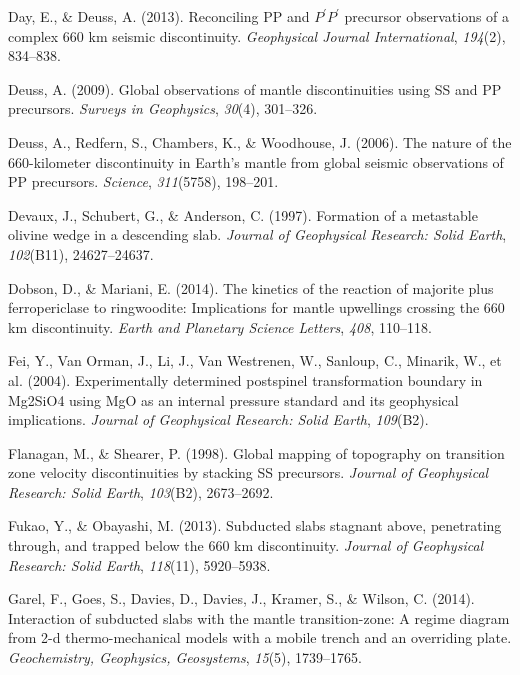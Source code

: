 \documentclass[draft,linenumbers]{agujournal2019}
\newlength{\cslhangindent}
\newenvironment{CSLReferences}[2]
 {\begin{list}{}{
  \setlength{\itemindent}{0pt}
  \setlength{\leftmargin}{0pt}
  \setlength{\parsep}{0pt}
  \ifodd #1
   \setlength{\leftmargin}{\cslhangindent}
   \setlength{\itemindent}{-\cslhangindent}
  \fi
  \setlength{\itemsep}{#2\baselineskip}
  }
  \item\relax}
 {\end{list}}
\begin{document}
\begin{CSLReferences}{1}{0}
Day, E., \& Deuss, A. (2013). Reconciling {PP} and
{\(P^\prime P^\prime\)} precursor observations of a complex 660 km
seismic discontinuity. \emph{Geophysical Journal International},
\emph{194}(2), 834--838.

Deuss, A. (2009). Global observations of mantle discontinuities using
{SS} and {PP} precursors. \emph{Surveys in Geophysics}, \emph{30}(4),
301--326.

Deuss, A., Redfern, S., Chambers, K., \& Woodhouse, J. (2006). The
nature of the 660-kilometer discontinuity in {Earth}'s mantle from
global seismic observations of {PP} precursors. \emph{Science},
\emph{311}(5758), 198--201.

Devaux, J., Schubert, G., \& Anderson, C. (1997). Formation of a
metastable olivine wedge in a descending slab. \emph{Journal of
Geophysical Research: Solid Earth}, \emph{102}(B11), 24627--24637.

Dobson, D., \& Mariani, E. (2014). The kinetics of the reaction of
majorite plus ferropericlase to ringwoodite: Implications for mantle
upwellings crossing the 660 km discontinuity. \emph{Earth and Planetary
Science Letters}, \emph{408}, 110--118.

Fei, Y., Van Orman, J., Li, J., Van Westrenen, W., Sanloup, C., Minarik,
W., et al. (2004). Experimentally determined postspinel transformation
boundary in Mg2SiO4 using MgO as an internal pressure standard and its
geophysical implications. \emph{Journal of Geophysical Research: Solid
Earth}, \emph{109}(B2).

Flanagan, M., \& Shearer, P. (1998). Global mapping of topography on
transition zone velocity discontinuities by stacking {SS} precursors.
\emph{Journal of Geophysical Research: Solid Earth}, \emph{103}(B2),
2673--2692.

Fukao, Y., \& Obayashi, M. (2013). Subducted slabs stagnant above,
penetrating through, and trapped below the 660 km discontinuity.
\emph{Journal of Geophysical Research: Solid Earth}, \emph{118}(11),
5920--5938.

Garel, F., Goes, S., Davies, D., Davies, J., Kramer, S., \& Wilson, C.
(2014). Interaction of subducted slabs with the mantle transition-zone:
A regime diagram from 2-d thermo-mechanical models with a mobile trench
and an overriding plate. \emph{Geochemistry, Geophysics, Geosystems},
\emph{15}(5), 1739--1765.


\end{CSLReferences}
\end{document}
